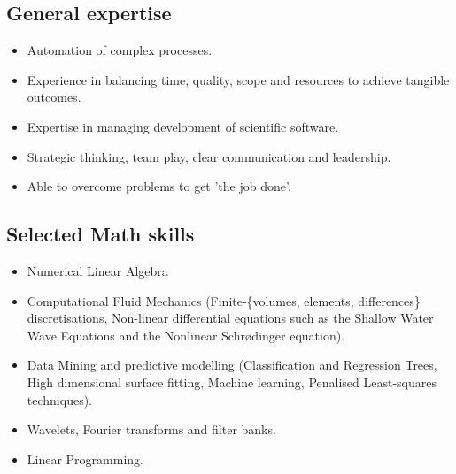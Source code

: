 \documentclass[12pt,a4paper]{article}
\begin{document}

%

\subsection*{General expertise}
\begin{itemize} 
  \item Automation of complex processes.
  \item Experience in balancing time, quality, scope and resources to achieve tangible outcomes.
  \item Expertise in managing development of scientific software. 
  \item Strategic thinking, team play, clear communication and leadership.
  \item Able to overcome problems to get 'the job done'.  
\end{itemize}


\subsection*{Selected Math skills}
\begin{itemize} 
  \item Numerical Linear Algebra
  \item Computational Fluid Mechanics (Finite-\{volumes, elements, differences\} discretisations, 
  Non-linear differential equations such as the Shallow Water Wave Equations and the 
  Nonlinear Schr\o{}dinger equation).  
  \item Data Mining and predictive modelling (Classification and Regression Trees, High dimensional 
  surface fitting, Machine learning, Penalised Least-squares techniques).     
  \item Wavelets, Fourier transforms and filter banks.
  \item Linear Programming.
\end{itemize}
\end{document}
